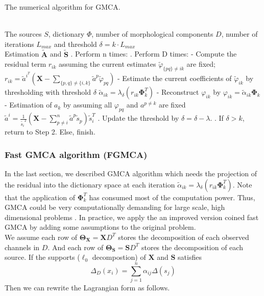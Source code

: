 \begin{algorithm}[!htbp] 
\caption{ The numerical algorithm for GMCA.} 
\label{algFramwork3} 
\begin{algorithmic}
\REQUIRE ~~\\%
The sources $S$, dictionary $\Phi$, number of morphological components $D$, number of iterations $L_{max}$ and threshold $\delta = k \cdot L_{max}$
\ENSURE ~~\\ %
Estimation $\tilde{\mathbf{A}}$ and $\tilde{\mathbf{S}}$
. Perform n times:
\STATE {}. Perform D times:
\STATE \qquad \quad - Compute the residual term $r_{ik}$ assuming the current estimates $\tilde{\varphi}_{\{pq\} \neq ik}$ are fixed; 
\STATE \qquad \quad $r_{ik} = \tilde{a}^i^T(\mathbf{X} - \sum_{\{p,q\} \neq \{i,k\}} \tilde{a}^p \tilde{\varphi}_{pq}) $
\STATE \qquad \quad - Estimate the current coefficients of $\tilde{\varphi}_{ik}$ by thresholding with threshold $\delta$
\STATE \qquad \quad $\tilde{\alpha}_{ik} = \lambda_{\delta}(r_{ik}\mathbf{\Phi}_k^T)$
\STATE \qquad \quad - Reconstruct $\varphi_{ik}$ by $\varphi_{ik} = \tilde{\alpha}_{ik} \mathbf{\Phi}_k$
\STATE \qquad \quad - Estimation of $a_k$ by assuming all $\varphi_{pq}$ and $a^{p \neq k}$ are fixed 
\STATE \qquad \quad $\tilde{a}^i = \frac{1}{\tilde{s_i}^2}(\mathbf{X} - \sum_{p\neq i}^n \tilde{a}^p\tilde{s}_p)\tilde{s}_i^T$
. Update the threshold by $\delta = \delta - \lambda$.
. If $\delta>k $, return to Step 2. Else, finish.
\end{algorithmic}
\end{algorithm}

\subsubsection{Fast GMCA algorithm (FGMCA)}
In the last section, we described GMCA algorithm which needs the projection of the residual into the dictionary space at each iteration $\tilde{\alpha}_{ik} = \lambda_{\delta}(r_{ik}\mathbf{\Phi}_k^T)$. Note that the application of $\mathbf{\Phi}_k^T$ has consumed most of the computation power. Thus, GMCA could be very computationally demanding for large scale, high dimensional problems \cite{BobinJ_2007SaMD}. In practice, we apply the an improved version coined fast GMCA by adding some assumptions to the original problem.\\

We assume each row of $\mathbf{\Theta_X}=\mathbf{X}D^T$ stores the decomposition of each observed channels in $D$. And each row of $\mathbf{\Theta_S}=\mathbf{S}D^T$ stores the decomposition of each source. 
If the supports ($\ell_0$ decompostion) of $\mathbf{X}$ and $\mathbf{S}$ satisfies 
\begin{equation}
    \Delta_D(x_i) = \sum_{j=1}^{n}\alpha_{ij}\Delta(s_j)
\end{equation}
Then we can rewrite the Lagrangian form \label{GMCAequation} as follows.

